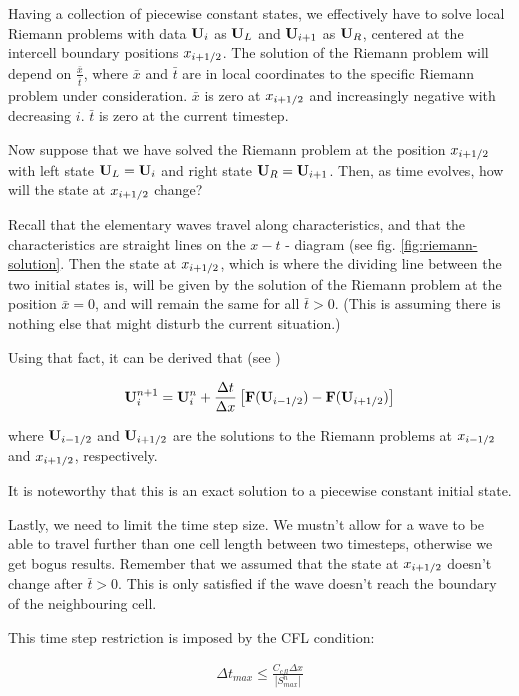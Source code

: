 Having a collection of piecewise constant states, we effectively have to solve local Riemann problems with data $\mathbf{U}_i$ as $\mathbf{U}_L$ and $\mathbf{U}_{i+1}$ as $\mathbf{U}_R$, centered at the intercell boundary positions $x_{i+1/2}$.
The solution of the Riemann problem will depend on $\frac{\bar{x}}{\bar{t}}$, where $\bar{x}$ and $\bar{t}$ are in local coordinates to the specific Riemann problem under consideration. 
$\bar{x}$ is zero at $x_{i+1/2}$ and increasingly negative with decreasing $i$.
$\bar{t}$ is zero at the current timestep.


Now suppose that we have solved the Riemann problem at the position $x_{i+1/2}$ with left state $\mathbf{U}_L = \mathbf{U}_i$ and right state $\mathbf{U}_R = \mathbf{U}_{i+1}$.
Then, as time evolves, how will the state at $x_{i+1/2}$ change?

Recall that the elementary waves travel along characteristics, and that the characteristics are straight lines on the $x-t$ - diagram (see fig. \ref{fig:riemann-solution}.
Then the state at $x_{i+1/2}$, which is where the dividing line between the two initial states is, will be given by the solution of the Riemann problem at the position $\bar{x} = 0$, and will remain the same for all $\bar{t} > 0$.
(This is assuming there is nothing else that might disturb the current situation.)


Using that fact, it can be derived that (see \cite{toro}) 

\begin{align}
	\mathbf{U}^{n+1}_i = \mathbf{U}^n_i + \frac{\Delta t}{\Delta x} \left[\mathbf{F}(\mathbf{U}_{i-1/2}) - \mathbf{F}(\mathbf{U}_{i+1/2}) \right]
\end{align}

where $\mathbf{U}_{i-1/2}$ and $\mathbf{U}_{i+1/2}$ are the solutions to the Riemann problems at $x_{i-1/2}$ and $x_{i+1/2}$, respectively.


It is noteworthy that this is an exact solution to a piecewise constant initial state.




Lastly, we need to limit the time step size.
We mustn't allow for a wave to be able to travel further than one cell length between two timesteps, otherwise we get bogus results.
Remember that we assumed that the state at $x_{i+1/2}$ doesn't change after $\bar{t} > 0$.
This is only satisfied if the wave doesn't reach the boundary of the neighbouring cell.

This time step restriction is imposed by the CFL condition:

\begin{align}
	\Delta t_{max} \leq \frac{C_{cfl} \Delta x}{|S_{max}^n|}
\end{align}


